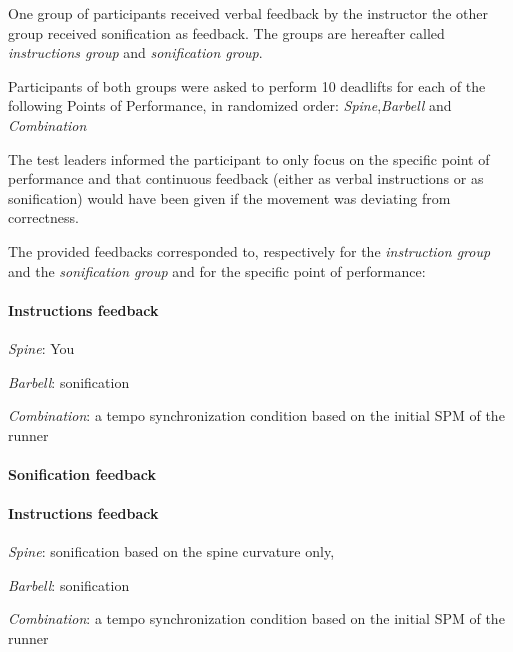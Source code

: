 \documentclass[10pt,letterpaper]{article}
\begin{document}
One group of participants received verbal feedback by the instructor the other group received sonification as feedback. The groups are hereafter called \emph{instructions group} and \emph{sonification group}.

Participants of both groups were asked to perform 10 deadlifts for each of the following Points of Performance, in randomized order:
\emph{Spine},\emph{Barbell} and \emph{Combination}

The test leaders informed the participant to only focus on the specific point of performance and that continuous feedback (either as verbal instructions or as sonification) would have been given if the movement was deviating from correctness.

The provided feedbacks corresponded to, respectively for the \emph{instruction group} and the \emph{sonification group} and for the specific point of performance:

\paragraph{Instructions feedback} 
\begin{description}
\item  \emph{Spine}: You
\item  \emph{Barbell}: sonification 
\item  \emph{Combination}: a tempo synchronization condition based on the initial SPM of the runner
\end{description}


\paragraph{Sonification feedback}
\paragraph{Instructions feedback} 
\begin{description}
\item  \emph{Spine}: sonification based on the spine curvature only, 
\item  \emph{Barbell}: sonification 
\item  \emph{Combination}: a tempo synchronization condition based on the initial SPM of the runner
\end{description}




%
%
%
\end{document}
